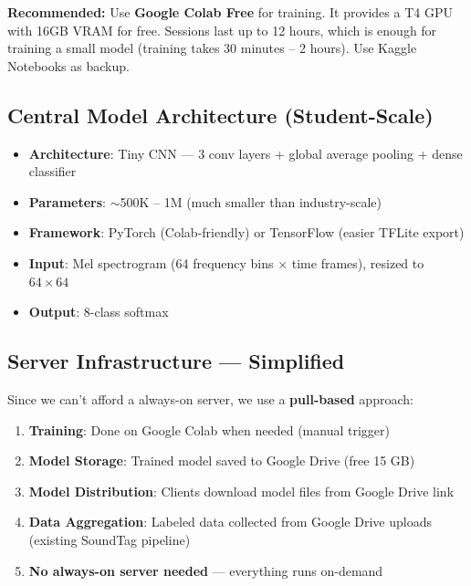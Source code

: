 \documentclass[11pt,a4paper]{article}
\begin{document}
\begin{highlightbox}
\textbf{Recommended:} Use \textbf{Google Colab Free} for training. It provides a T4 GPU with 16GB VRAM for free. Sessions last up to 12 hours, which is enough for training a small model (training takes 30 minutes -- 2 hours). Use Kaggle Notebooks as backup.
\end{highlightbox}

\subsection{Central Model Architecture (Student-Scale)}

\begin{itemize}[leftmargin=*,noitemsep]
    \item \textbf{Architecture}: Tiny CNN — 3 conv layers + global average pooling + dense classifier
    \item \textbf{Parameters}: $\sim$500K -- 1M (much smaller than industry-scale)
    \item \textbf{Framework}: PyTorch (Colab-friendly) or TensorFlow (easier TFLite export)
    \item \textbf{Input}: Mel spectrogram (64 frequency bins $\times$ time frames), resized to $64 \times 64$
    \item \textbf{Output}: 8-class softmax
\end{itemize}

\subsection{Server Infrastructure — Simplified}

Since we can't afford a always-on server, we use a \textbf{pull-based} approach:

\begin{enumerate}[leftmargin=*,noitemsep]
    \item \textbf{Training}: Done on Google Colab when needed (manual trigger)
    \item \textbf{Model Storage}: Trained model saved to Google Drive (free 15 GB)
    \item \textbf{Model Distribution}: Clients download model files from Google Drive link
    \item \textbf{Data Aggregation}: Labeled data collected from Google Drive uploads (existing SoundTag pipeline)
    \item \textbf{No always-on server needed} — everything runs on-demand
\end{enumerate}
\end{document}
